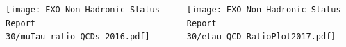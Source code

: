 \documentclass[8pt,xcolor=dvipsnames,xcolor=table]{beamer}
\begin{document}
\begin{frame}

\begin{columns}

\begin{column}{.5\textwidth}
\centering
\texttt{[image: EXO Non Hadronic Status Report 30/muTau\_ratio\_QCDs\_2016.pdf]}
\end{column}

\begin{column}{.5\textwidth}
\centering
\texttt{[image: EXO Non Hadronic Status Report 30/etau\_QCD\_RatioPlot2017.pdf]}
\end{column}
\end{columns}

\end{frame}
\end{document}
